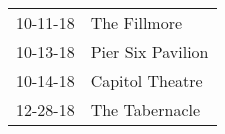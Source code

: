 \begin{supertabular}{p{0.07\textwidth}p{0.23\textwidth}}
 10-11-18 &       The Fillmore \\
 10-13-18 &  Pier Six Pavilion \\
 10-14-18 &    Capitol Theatre \\
 12-28-18 &     The Tabernacle \\
\end{supertabular}

